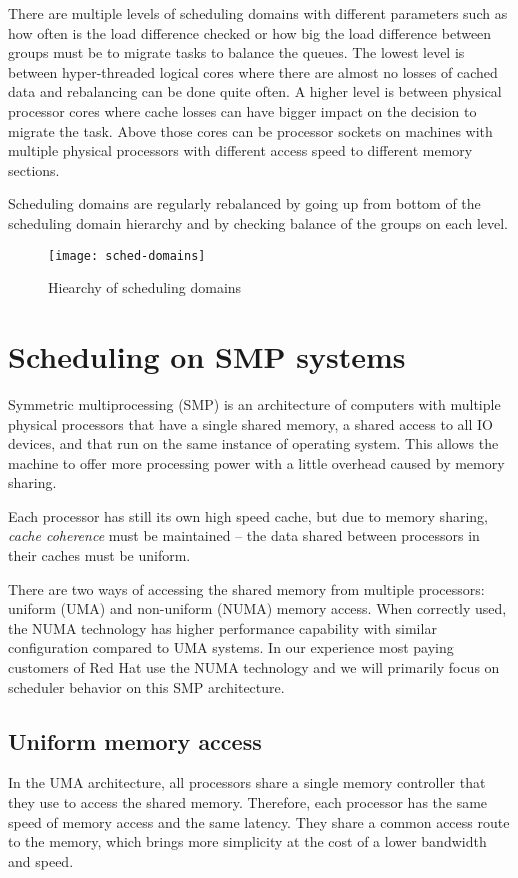 There are multiple levels of scheduling domains with different parameters such as
how often is the load difference checked or how big the load difference between
groups must be to migrate tasks to balance the queues.
The lowest level is between hyper-threaded logical cores where there are almost
no losses of cached data and rebalancing can be done quite often.
A higher level is between physical processor cores where cache losses can have
bigger impact on the decision to migrate the task.
Above those cores can be processor sockets on machines with multiple physical
processors with different access speed to different memory sections.

Scheduling domains are regularly rebalanced by going up from bottom of the
scheduling domain hierarchy and by checking balance of the groups on each level.

\begin{figure}
  \centering
  \texttt{[image: sched-domains]}
  \caption{Hiearchy of scheduling domains\cite{sched-groups-lwn}}
  \label{fig:sched-dom}
\end{figure}

\section{Scheduling on SMP systems}
Symmetric multiprocessing (SMP) is an architecture of computers with multiple
physical processors that have a single shared memory, a shared access to all IO
devices, and that run on the same instance of operating system. This allows the
machine to offer more processing power with a little overhead caused by memory
sharing.

Each processor has still its own high speed cache, but due to memory sharing,
\emph{cache coherence} must be maintained -- the data shared between processors
in their caches must be uniform.

There are two ways of accessing the shared memory from multiple processors:
uniform (UMA) and non-uniform (NUMA) memory access. When correctly used, the
NUMA technology has higher performance capability with similar configuration
compared to UMA systems. In our experience most paying customers of Red Hat use
the NUMA technology and we will primarily focus on scheduler behavior on this
SMP architecture.

\subsection{Uniform memory access}
In the UMA architecture, all processors share a single memory controller that
they use to access the shared memory. Therefore, each processor has the same
speed of memory access and the same latency. They share a common access route to
the memory, which brings more simplicity at the cost of a lower bandwidth and
speed.


